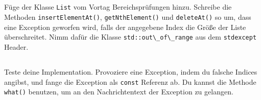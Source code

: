 \subsection{}
Füge der Klasse \lstinline{List} vom Vortag Bereichsprüfungen hinzu.
Schreibe die Methoden \lstinline{insertElementAt()}, \lstinline{getNthElement()} und \lstinline{deleteAt()} so um, dass eine Exception geworfen wird, falls der angegebene Index die Größe der Liste überschreitet.
Nimm dafür die Klasse \lstinline{std::out\_of\_range} aus dem \lstinline{stdexcept} Header.

\subsection{}
Teste deine Implementation.
Provoziere eine Exception, indem du falsche Indices angibst, und fange die Exception als \lstinline{const} Referenz ab. Du kannst die Methode \lstinline{what()} benutzen, um an den Nachrichtentext der Exception zu gelangen.
